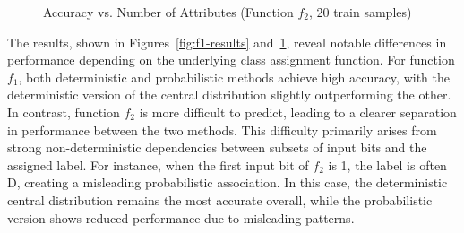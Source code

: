 \begin{figure}[htbp]
    \centering
    \caption{Accuracy vs. Number of Attributes (Function $f_2$, 20 train samples)}
    \label{fig:f2-results}
\end{figure}

The results, shown in Figures~\ref{fig:f1-results} and~\ref{fig:f2-results}, reveal notable differences in
performance depending on the underlying class assignment function.
For function $f_1$, both deterministic and probabilistic methods achieve high accuracy, with the deterministic
version of the central distribution slightly outperforming the other.
In contrast, function $f_2$ is more difficult to predict, leading to a clearer separation in performance between the
two methods.
This difficulty primarily arises from strong non-deterministic dependencies between subsets of input bits and the
assigned label.
For instance, when the first input bit of $f_2$ is 1, the label is often D, creating a misleading
probabilistic association.
In this case, the deterministic central distribution remains the most accurate overall, while the probabilistic
version shows reduced performance due to misleading patterns.

